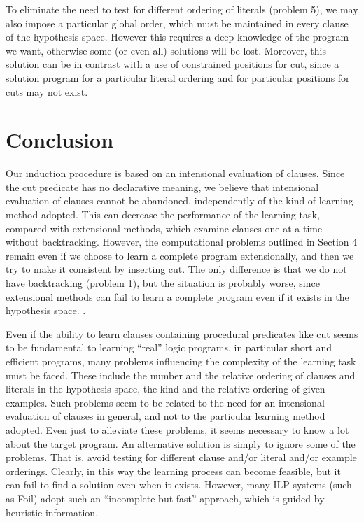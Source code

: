 To eliminate the need to test for different ordering of literals
(problem 5), we may also impose a particular global order,
which must be maintained in every clause of the hypothesis space.
However this requires a deep knowledge of the program we want,
otherwise some (or even all) solutions will be lost. Moreover, this 
solution can be in contrast with a use of constrained positions for cut,
since a solution program for a particular literal 
ordering and for particular positions for cuts may not exist.
 
\section{Conclusion}
 
Our induction procedure is based on
an intensional evaluation of clauses. 
Since the cut predicate has no declarative meaning,
we believe that intensional evaluation of
clauses cannot be abandoned, independently of the 
kind of learning method adopted. This can 
decrease the performance of the learning task, compared with
extensional methods, which examine clauses one at a time
without backtracking. However, the computational problems outlined in
Section 4 remain even if we choose to learn a complete program 
extensionally, and then we try to make it consistent by inserting cut.
The only difference is that we do not have backtracking (problem 1),
but the situation is probably worse, since extensional methods can fail
to learn a complete program even if it exists in the hypothesis space.
\cite{bergtkde93}.
 
Even if the ability to learn clauses containing procedural
predicates like cut seems to be fundamental to learning ``real'' 
logic programs, in particular  
short and efficient programs,
many  problems influencing the complexity 
of the learning task
must be faced. These include the number
and the relative ordering of clauses and literals in the hypothesis space, 
the kind and the relative ordering of given examples. 
Such problems seem to be related to the need for an
intensional evaluation of clauses in general, and not to the particular
learning method adopted. Even just to alleviate these problems, it seems
necessary to know a lot about the target program.
An alternative solution is simply to ignore some of the problems.
That is, avoid testing for different clause and/or literal and/or example
orderings.
Clearly, in this way the learning process can become feasible,
but it can fail to find a solution even when it exists.
However, many ILP systems 
(such as Foil) adopt such an ``incomplete-but-fast'' approach,
which is guided by heuristic information.
 
